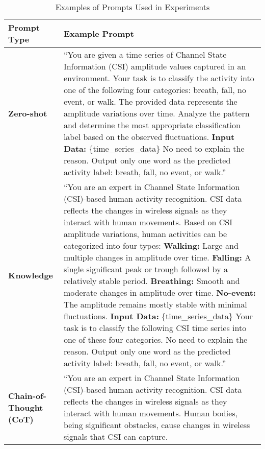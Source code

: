 \begin{table}[ht]
    \centering
    \small
    \caption{Examples of Prompts Used in Experiments}
    \begin{tabular}{p{3cm} p{10cm}}
        \toprule
        \textbf{Prompt Type} & \textbf{Example Prompt} \\
        \midrule
        \textbf{Zero-shot} & 
        ``You are given a time series of Channel State Information (CSI) amplitude values captured in an environment. Your task is to classify the activity into one of the following four categories: breath, fall, no event, or walk. The provided data represents the amplitude variations over time. Analyze the pattern and determine the most appropriate classification label based on the observed fluctuations. \newline
        \textbf{Input Data:} \{time\_series\_data\} \newline
        No need to explain the reason. Output only one word as the predicted activity label: breath, fall, no event, or walk.'' \\
        \midrule
        \textbf{Knowledge} & 
        ``You are an expert in Channel State Information (CSI)-based human activity recognition. CSI data reflects the changes in wireless signals as they interact with human movements. Based on CSI amplitude variations, human activities can be categorized into four types:\newline
        \textbf{Walking:} Large and multiple changes in amplitude over time. \newline
        \textbf{Falling:} A single significant peak or trough followed by a relatively stable period. \newline
        \textbf{Breathing:} Smooth and moderate changes in amplitude over time. \newline
        \textbf{No-event:} The amplitude remains mostly stable with minimal fluctuations. \newline
        \textbf{Input Data:} \{time\_series\_data\} \newline
        Your task is to classify the following CSI time series into one of these four categories. \newline
        No need to explain the reason. Output only one word as the predicted activity label: breath, fall, no event, or walk.'' \\
        \midrule
        \textbf{Chain-of-Thought (CoT)} & 
        ``You are an expert in Channel State Information (CSI)-based human activity recognition. CSI data reflects the changes in wireless signals as they interact with human movements. Human bodies, being significant obstacles, cause changes in wireless signals that CSI can capture.\newline

\end{tabular}
\end{table}
